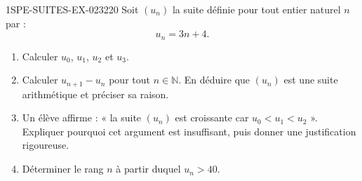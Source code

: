 \begin{exercice}{1SPE-SUITES-EX-023}{2}{20}
Soit $(u_n)$ la suite définie pour tout entier naturel $n$ par :
\[
  u_n = 3n + 4.
\]

\begin{enumerate}
  \item Calculer $u_0$, $u_1$, $u_2$ et $u_3$.

  \item Calculer $u_{n+1} - u_n$ pour tout $n \in \mathbb{N}$. En déduire que $(u_n)$ est une suite arithmétique et préciser sa raison.

  \item Un élève affirme : « la suite $(u_n)$ est croissante car $u_0 < u_1 < u_2$ ». Expliquer pourquoi cet argument est insuffisant, puis donner une justification rigoureuse.

  \item Déterminer le rang $n$ à partir duquel $u_n > 40$.
\end{enumerate}
\end{exercice}
